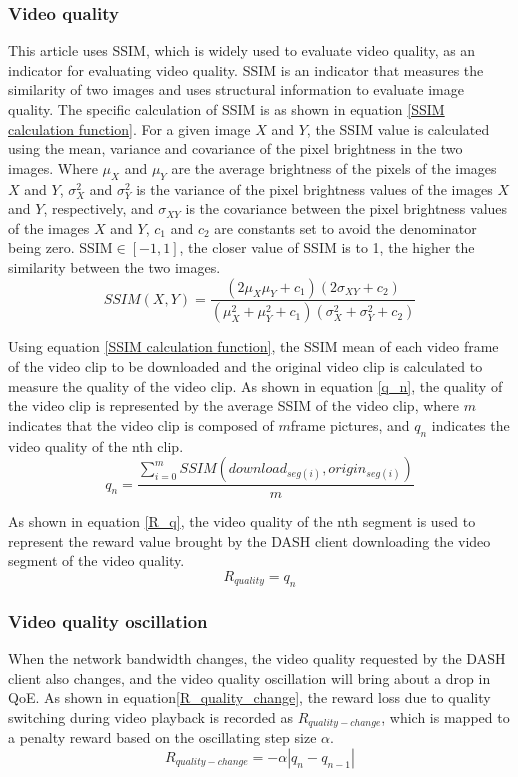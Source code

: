 \documentclass[twocolumn]{article}
\begin{document}
\subsubsection{Video quality}
This article uses SSIM, which is widely used to evaluate video quality, 
as an indicator for evaluating video quality\cite{RN15,RN16,RN17}.
SSIM is an indicator that measures the similarity of two images and 
uses structural information to evaluate image quality.
The specific calculation of SSIM is as shown in equation \ref{SSIM calculation function}. 
For a given image $X$ and $Y$, the SSIM value is calculated using the mean, 
variance and covariance of the pixel brightness in the two images.
Where $\mu_{X}$ and $\mu_{Y}$ are the average brightness of the pixels of the 
images $X$ and $Y$, $\sigma_{X}^2$ and $\sigma_{Y}^2 $ is the variance of the pixel brightness 
values of the images $X$ and $Y$, respectively, and $\sigma_{XY}$ is the covariance between 
the pixel brightness values of the images $X$ and $Y$, $c_{1 }$ and $c_{2}$ are constants 
set to avoid the denominator being zero.
SSIM$\in\left[-1,1\right]$, the closer value of SSIM is to 1, the higher the similarity between the two images.
\begin{equation}
\label{SSIM calculation function}
SSIM\left(X,Y\right)=\frac{\left(2\mu_{X}\mu_{Y}+c_{1}\right)\left(2\sigma_{XY}+c_{2}\right)}
{\left(\mu_{X}^2+\mu_{Y}^2+c_{1}\right)\left(\sigma_{X}^2+\sigma_{Y}^2+c_{2}\right)}
\end{equation}

Using equation \ref{SSIM calculation function}, the SSIM mean of each video frame of the video clip to be 
downloaded and the original video clip is calculated to measure the 
quality of the video clip. 
As shown in equation \ref{q_n}, the quality of the video clip is represented by the average SSIM of the video clip, 
where $m$ indicates that the video clip is composed of $m$frame pictures, and $q_{n}$ 
indicates the video quality of the nth clip.
\begin{equation}
\label{q_n}
q_{n}=\frac{\sum_{i=0}^m SSIM(download_{seg(i)},origin_{seg(i)})}{m}
\end{equation}

As shown in equation \ref{R_q}, the video quality of the nth segment is used to represent the reward value 
brought by the DASH client downloading the video segment of the video quality.
\begin{equation}
\label{R_q}
R_{quality}=q_{n}
\end{equation}
\subsubsection{Video quality oscillation}
When the network bandwidth changes, the video quality requested by the DASH client also changes, 
and the video quality oscillation will bring about a drop in QoE. As shown in equation\ref{R_quality_change}, 
the reward loss due to quality switching during video playback is recorded as $R_{quality-change}$, 
which is mapped to a penalty reward based on the oscillating step size $\alpha$.
\begin{equation}
\label{R_quality_change}
R_{quality-change}=-\alpha\left|q_{n}-q_{n-1}\right|
\end{equation}
\end{document}

